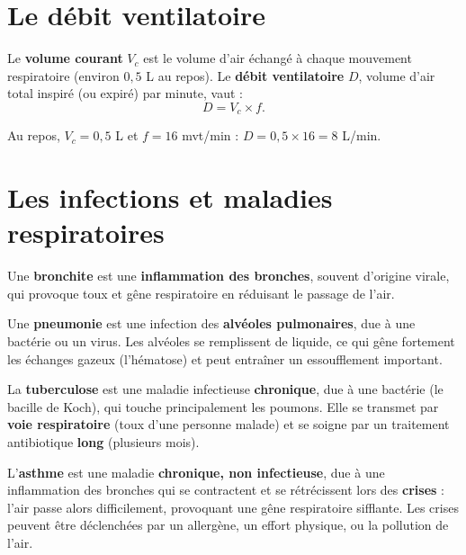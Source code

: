 \section{Le débit ventilatoire}

\begin{propriete}
Le \textbf{volume courant} $V_c$ est le volume d'air échangé à chaque mouvement
respiratoire (environ $0{,}5$ L au repos). Le \textbf{débit ventilatoire} $D$, volume
d'air total inspiré (ou expiré) par minute, vaut :
\[
D=V_c\times f.
\]
\end{propriete}

\begin{exemple}
Au repos, $V_c=0{,}5$ L et $f=16$ mvt/min : $D=0{,}5\times16=8$ L/min.
\end{exemple}

\section{Les infections et maladies respiratoires}

\begin{definition}[Bronchite]
Une \textbf{bronchite} est une \textbf{inflammation des bronches}, souvent d'origine
virale, qui provoque toux et gêne respiratoire en réduisant le passage de l'air.
\end{definition}

\begin{definition}[Pneumonie]
Une \textbf{pneumonie} est une infection des \textbf{alvéoles pulmonaires}, due à une
bactérie ou un virus. Les alvéoles se remplissent de liquide, ce qui gêne fortement les
échanges gazeux (l'hématose) et peut entraîner un essoufflement important.
\end{definition}

\begin{definition}[Tuberculose]
La \textbf{tuberculose} est une maladie infectieuse \textbf{chronique}, due à une
bactérie (le bacille de Koch), qui touche principalement les poumons. Elle se
transmet par \textbf{voie respiratoire} (toux d'une personne malade) et se soigne par
un traitement antibiotique \textbf{long} (plusieurs mois).
\end{definition}

\begin{definition}[Asthme]
L'\textbf{asthme} est une maladie \textbf{chronique, non infectieuse}, due à une
inflammation des bronches qui se contractent et se rétrécissent lors des
\textbf{crises} : l'air passe alors difficilement, provoquant une gêne respiratoire
sifflante. Les crises peuvent être déclenchées par un allergène, un effort physique,
ou la pollution de l'air.
\end{definition}

